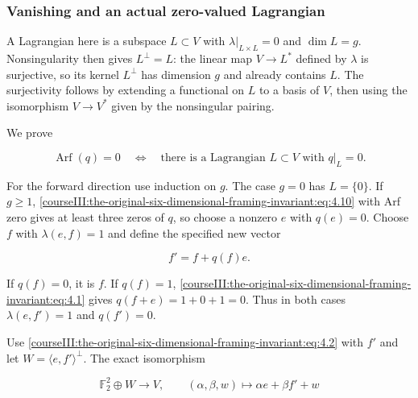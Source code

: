 \subsubsection{Vanishing and an actual zero-valued Lagrangian}
\label{courseIII:the-original-six-dimensional-framing-invariant:section-4.1}

A Lagrangian here is a subspace \(L\subset V\) with \(\lambda|_{L\times L}=0\) and \(\dim L=g\). Nonsingularity then gives \(L^\perp=L\): the linear map \(V\to L^*\) defined by \(\lambda\) is surjective, so its kernel \(L^\perp\) has dimension \(g\) and already contains \(L\). The surjectivity follows by extending a functional on \(L\) to a basis of \(V\), then using the isomorphism \(V\to V^*\) given by the nonsingular pairing.

We prove

\begin{equation}
\operatorname{Arf}(q)=0
 \quad\Longleftrightarrow\quad
 \text{there is a Lagrangian }L\subset V\text{ with }q|_L=0.
 \label{courseIII:the-original-six-dimensional-framing-invariant:eq:4.11}
\end{equation}

For the forward direction use induction on \(g\). The case \(g=0\) has \(L=\{0\}\). If \(g\ge1\), \eqref{courseIII:the-original-six-dimensional-framing-invariant:eq:4.10} with Arf zero gives at least three zeros of \(q\), so choose a nonzero \(e\) with \(q(e)=0\). Choose \(f\) with \(\lambda(e,f)=1\) and define the specified new vector

\begin{equation}
f'=f+q(f)e.
 \label{courseIII:the-original-six-dimensional-framing-invariant:eq:4.12}
\end{equation}

If \(q(f)=0\), it is \(f\). If \(q(f)=1\), \eqref{courseIII:the-original-six-dimensional-framing-invariant:eq:4.1} gives
\(q(f+e)=1+0+1=0\). Thus in both cases \(\lambda(e,f')=1\) and \(q(f')=0\).

Use \eqref{courseIII:the-original-six-dimensional-framing-invariant:eq:4.2} with \(f'\) and let \(W=\langle e,f'\rangle^\perp\). The exact isomorphism

\begin{equation}
\mathbb F_2^2\oplus W\longrightarrow V,\qquad
 (\alpha,\beta,w)\longmapsto\alpha e+\beta f'+w
 \label{courseIII:the-original-six-dimensional-framing-invariant:eq:4.13}
\end{equation}


